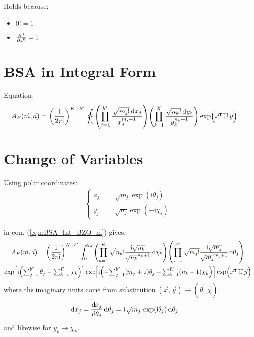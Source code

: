 \documentclass[
	english,
	a4paper,
	fontsize=10pt,
	parskip=half,
	titlepage=true,
	DIV=12,
	final
]{scrreprt}
\newcommand*{\transp}{\ensuremath{^\intercal}}
\newcommand*{\iunit}{\ensuremath{\mathrm{i}}}
\begin{document}
Holds because:
\begin{itemize}
\item $0! = 1$
\item $\pdv[0]{z} = 1$
\end{itemize}

\section{BSA in Integral Form}
Equation:
\begin{align}
	A_F(\vec{m}, \vec{n})
&=
	\qty(
		\frac{1}{2\pi\iunit}
	)^{K + b^*}
	\oint_{\gamma}
		\qty( \prod_{j=1}^{b^*}
			\frac
				{\sqrt{m_j!} \dd{x_j}}
				{x_j^{m_j+1}}
		)
		\qty( \prod_{k=1}^{K}
			\frac
				{\sqrt{n_k!} \dd{y_k}}
				{ y_k^{n_k+1} }
		)
		\exp( \Big. \vec{x}\transp \, \mathbb{U} \, \vec{y})
	\label{eqn:BSA_Int_BZO_m}
\end{align}

\section{Change of Variables}
Using polar coordinates:
\begin{align}
	\begin{cases}
	x_j &= \sqrt{m_j} \exp( \iunit \theta_j) \\
	y_j &= \sqrt{n_j} \exp(-\iunit \chi  _j)
	\end{cases}
	\label{eqn:DefXY}
\end{align}

in eqn. (\ref{eqn:BSA_Int_BZO_m}) gives:
\begin{multline}
	A_F(\vec{m}, \vec{n})
=
	\qty(
		\frac{1}{2\pi\iunit}
	)^{K + b^*}
	\int_{0}^{2\pi}
		\qty( \prod_{k=1}^{K}
			\sqrt{n_k!}
			\frac
				{ {\color{blue} \iunit} \sqrt{n_k}}
				{ \sqrt{n_k}^{n_k + 1} }
			\dd{\chi_k}
		)
		\qty( \prod_{j=1}^{b^*}
			\sqrt{m_j!}
			\frac
				{ {\color{blue} \iunit} \sqrt{m_j}}
				{ \sqrt{m_j}^{m_j + 1} }
			\dd{\theta_j}
		)
\\
	\exp[ \iunit \qty(
		{\textstyle \sum_{j=1}^{b^*} \theta_j} - 
		{\textstyle \sum_{k=1}^{K}   \chi  _k}
	)]
	\exp[
		\iunit \qty(
			-{\textstyle \sum_{j=1}^{b^*} (m_j + 1) \theta_j}
			+{\textstyle \sum_{k=1}^{K}   (n_k + 1) \chi  _k}
	)]
	\exp( \Big. \vec{x}\transp \, \mathbb{U} \, \vec{y})
\end{multline}
where the imaginary units come from substitution $(\vec{x}, \vec{y}) \to (\vec{\theta}, \vec{\chi})$:
\begin{align}
	\dd{x_j}
&=
	\dv{x_j}{\theta_j} \dd{\theta_j}
=
	\iunit \, \sqrt{m_j} \, \exp(\iunit \theta_j) \dd{\theta_j}
\end{align}
and likewise for $y_k \to \chi_k$.
\end{document}
